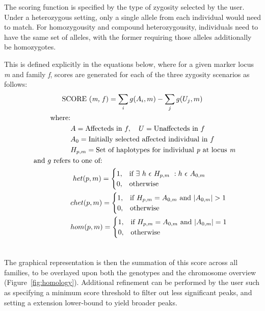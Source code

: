 \documentclass{bioinfo}
\numberwithin{equation}{section}
\begin{document}
\begin{methods}
The scoring function is specified by the type of zygosity selected by the user. Under a heterozygous setting, only a single allele from each individual would need to match. For homozygousity and compound heterozygousity, individuals need to have the same set of alleles, with the former requiring those alleles additionally be homozygotes.

\pagebreak
This is defined explicitly in the equations below, where for a given marker locus \textit{m} and family \textit{f}, scores are generated for each of the three zygosity scenarios as follows:\
\begin{gather}
\text{SCORE (\textit{m, f})} = \sum_{i}{g(A_i,m)} - \sum_{j}{g(U_j,m)}\\
\
\begin{flalign}
\nonumber\
\text{where:}&\\
\nonumber\
& A = \text{Affecteds in }f,\ \ \ U = \text{Unaffecteds in }f\\
\nonumber\
& A_0 = \text{Initially selected affected individual in }f\\
\nonumber\
& H_{p,m} = \text{Set of haplotypes for individual \textit{p} at locus \textit{m}}\\
\nonumber\
\text{and }g \text{ refers} & \text{ to one of:}\\
\nonumber
& \ het(p,m) = \begin{cases}
	1 ,& \text{if } \exists\ h\ \epsilon\ H_{p,m}\ : h\ \epsilon\  A_{0,m}\\
	0 ,& \text{otherwise}
		\end{cases}\\
\nonumber\
& chet(p,m) = \begin{cases}
	1 ,& \text{if } H_{p,m} = A_{0,m} \text{ and } |A_{0,m}| > 1\\
	0 ,& \text{otherwise}
		\end{cases}\\
\nonumber
& hom(p,m) = \begin{cases}
	1 ,& \text{if } H_{p,m} = A_{0,m}  \text{ and } |A_{0,m}| = 1\\
	0 ,& \text{otherwise}
		\end{cases}\\
\nonumber
\end{flalign}
\end{gather}

\vspace{-10pt}
The graphical representation is then the summation of this score across all families, to be overlayed upon both the genotypes and the chromosome overview (Figure~\ref{fig:homology}). Additional refinement can be performed by the user such as specifying a minimum score threshold to filter out less significant peaks, and setting a extension lower-bound to yield broader peaks.

\end{methods}
\end{document}
